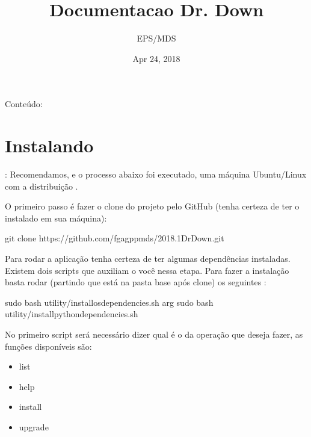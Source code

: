 \documentclass[letterpaper,10pt,english]{sphinxmanual}
\title{Documentacao Dr. Down}
\date{Apr 24, 2018}
\author{EPS/MDS}
\begin{document}
\maketitle
\sphinxtableofcontents
{}\label{\detokenize{index::doc}}


Conteúdo:


\chapter{Instalando}
\label{\detokenize{install:instalando}}\label{\detokenize{install::doc}}\label{\detokenize{install:bem-vindo-a-documentacao-do-dr-down}}
: Recomendamos, e o processo abaixo foi executado, uma máquina Ubuntu/Linux com a distribuição .

O primeiro passo é fazer o clone do projeto pelo GitHub (tenha certeza de ter o  instalado em sua máquina):

\begin{sphinxVerbatim}[commandchars=\\\{\}]
\PYGZdl{} git clone https://github.com/fga\PYGZhy{}gpp\PYGZhy{}mds/2018.1\PYGZhy{}Dr\PYGZhy{}Down.git
\end{sphinxVerbatim}

Para rodar a aplicação tenha certeza de ter algumas dependências instaladas. Existem dois scripts que auxiliam o você nessa etapa.
Para fazer a instalação basta rodar (partindo que está na pasta base após clone) os seguintes :

\begin{sphinxVerbatim}[commandchars=\\\{\}]
\PYGZdl{} sudo bash utility/install\PYGZus{}os\PYGZus{}dependencies.sh arg
\PYGZdl{} sudo bash utility/install\PYGZus{}python\PYGZus{}dependencies.sh
\end{sphinxVerbatim}

No primeiro script será necessário dizer qual é o  da operação que deseja fazer, as funções disponíveis são:
\begin{itemize}
\item {} 
list

\item {} 
help

\item {} 
install

\item {} 
upgrade

\end{itemize}
\end{document}
